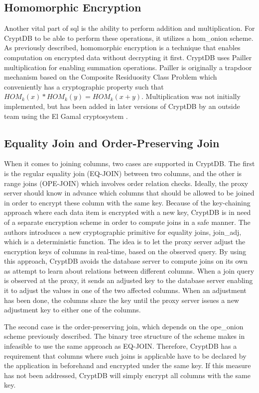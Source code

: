 \subsection{Homomorphic Encryption}
Another vital part of \Gls{sql} is the ability to perform addition and multiplication. For CryptDB to be able to perform these operations, it utilizes a \Gls{hom_onion} scheme. As previously described, homomorphic encryption is a technique that enables computation on encrypted data without decrypting it first. CryptDB uses Pailler multiplication \cite{Paillier} for enabling summation operations. Pailler is originally a trapdoor mechanism based on the Composite Residuosity Class Problem which conveniently has a cryptographic property such that $HOM_k(x) * HOM_k(y) = HOM_k(x + y)$. Multiplication was not initially implemented, but has been added in later versions of CryptDB by an outside team using the El Gamal cryptosystem \cite{cryptdb_guidelines}.


\subsection{Equality Join and Order-Preserving Join}
When it comes to joining columns, two cases are supported in CryptDB. The first is the regular equality join (EQ-JOIN) between two columns, and the other is range joins (OPE-JOIN) which involves order relation checks. Ideally, the proxy server should know in advance which columns that should be allowed to be joined in order to encrypt these column with the same key. Because of the key-chaining approach where each data item is encrypted with a new key, CryptDB is in need of a separate encryption scheme in order to compute joins in a safe manner. The authors \citep{CryptDB_Main_Paper} introduces a new cryptographic primitive for equality joins, \gls{join_adj}, which is a deterministic function. The idea is to let the proxy server adjust the encryption keys of columns in real-time, based on the observed query. By using this approach, CryptDB avoids the database server to compute joins on its own as attempt to learn about relations between different columns. When a join query is observed at the proxy, it sends an adjusted key to the database server enabling it to adjust the values in one of the two affected columns. When an adjustment has been done, the columns share the key until the proxy server issues a new adjustment key to either one of the columns.

The second case is the order-preserving join, which depends on the \gls{ope_onion} scheme previously described. The binary tree structure of the scheme makes in infeasible to use the same approach as EQ-JOIN. Therefore, CryptDB has a requirement that columns where such joins is applicable have to be declared by the application in beforehand and encrypted under the same key. If this measure has not been addressed, CryptDB will simply encrypt all columns with the same key.


